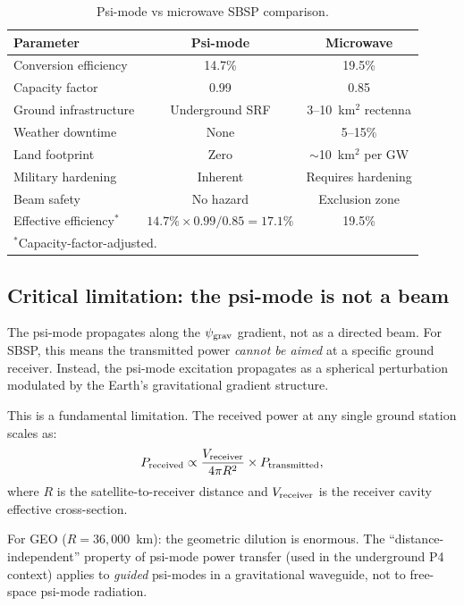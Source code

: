 \documentclass[11pt]{article}
\newcommand{\psigrav}{\psi_{\rm grav}}
\begin{document}
\begin{table}[H]
\centering
\caption{Psi-mode vs microwave SBSP comparison.}
\label{tab:SBSP-comparison}
\begin{tabular}{@{}lcc@{}}
\toprule
Parameter & Psi-mode & Microwave \\
\midrule
Conversion efficiency & 14.7\% & 19.5\% \\
Capacity factor & 0.99 & 0.85 \\
Ground infrastructure & Underground SRF & 3--10~km$^2$ rectenna \\
Weather downtime & None & 5--15\% \\
Land footprint & Zero & $\sim$10~km$^2$ per GW \\
Military hardening & Inherent & Requires hardening \\
Beam safety & No hazard & Exclusion zone \\
Effective efficiency$^*$ & $14.7\% \times 0.99/0.85 = 17.1\%$ & 19.5\% \\
\bottomrule
\multicolumn{3}{l}{\small $^*$Capacity-factor-adjusted.}
\end{tabular}
\end{table}

\subsection{Critical limitation: the psi-mode is not a beam}

The psi-mode propagates along the $\psigrav$ gradient, not as a directed beam.
For SBSP, this means the transmitted power \emph{cannot be aimed} at a specific
ground receiver. Instead, the psi-mode excitation propagates as a spherical
perturbation modulated by the Earth's gravitational gradient structure.

This is a fundamental limitation. The received power at any single ground
station scales as:
\begin{equation}
P_{\rm received} \propto \frac{V_{\rm receiver}}{4\pi R^2} \times P_{\rm transmitted},
\end{equation}
where $R$ is the satellite-to-receiver distance and $V_{\rm receiver}$ is
the receiver cavity effective cross-section.

For GEO ($R = 36{,}000$~km): the geometric dilution is enormous. The
``distance-independent'' property of psi-mode power transfer (used in the
underground P4 context) applies to \emph{guided} psi-modes in a
gravitational waveguide, not to free-space psi-mode radiation.
\end{document}
